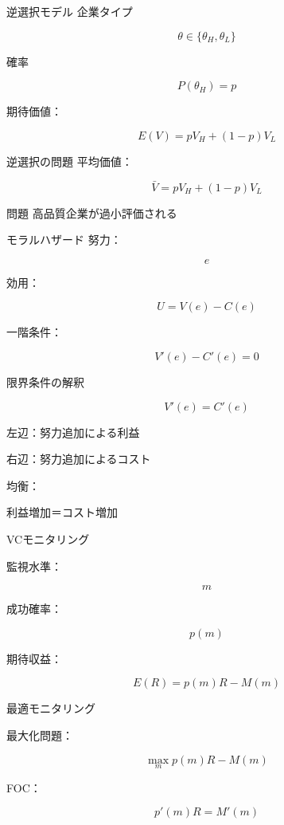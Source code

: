 \documentclass[aspectratio=169]{beamer}
\begin{document}
\begin{frame}{逆選択モデル}
企業タイプ

\[
\theta\in\{\theta_H,\theta_L\}
\]

確率

\[
P(\theta_H)=p
\]

期待価値：

\[
E(V)=pV_H+(1-p)V_L
\]

\end{frame}

\begin{frame}{逆選択の問題}
平均価値：

\[
\bar V
=
pV_H+(1-p)V_L
\]

\begin{alertblock}{問題}
高品質企業が過小評価される
\end{alertblock}
\end{frame}

\begin{frame}{モラルハザード}
努力：

\[
e
\]

効用：

\[
U=V(e)-C(e)
\]

一階条件：

\[
V'(e)-C'(e)=0
\]

\end{frame}

\begin{frame}{限界条件の解釈}

\[
V'(e)=C'(e)
\]

左辺：努力追加による利益

右辺：努力追加によるコスト

\vspace{0.3cm}

均衡：

利益増加＝コスト増加

\end{frame}

\begin{frame}{VCモニタリング}

監視水準：

\[
m
\]

成功確率：

\[
p(m)
\]

期待収益：

\[
E(R)
=
p(m)R-M(m)
\]

\end{frame}

\begin{frame}{最適モニタリング}

最大化問題：

\[
\max_m p(m)R-M(m)
\]

FOC：

\[
p'(m)R=M'(m)
\]

\end{frame}
\end{document}
